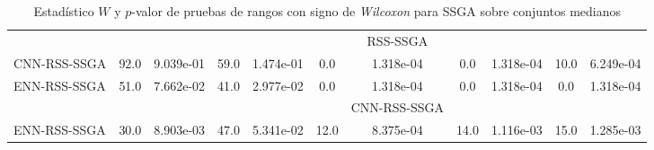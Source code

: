 \begin{table}[]
\begin{adjustbox}{max width =\textwidth}
\begin{tabular}{l c c c c c c c c c c}
\hline

 & & & & & & RSS-SSGA & & & & \\
CNN-RSS-SSGA & 92.0 & 9.039e-01 & 59.0 & 1.474e-01 & 0.0 & 1.318e-04 & 0.0 & 1.318e-04 & 10.0 & 6.249e-04 \\ 
ENN-RSS-SSGA & 51.0 & 7.662e-02 & 41.0 & 2.977e-02 & 0.0 & 1.318e-04 & 0.0 & 1.318e-04 & 0.0 & 1.318e-04 \\  

\hline

 & & & & & & CNN-RSS-SSGA & & & & \\ 
ENN-RSS-SSGA & 30.0 & 8.903e-03 & 47.0 & 5.341e-02 & 12.0 & 8.375e-04 & 14.0 & 1.116e-03 & 15.0 & 1.285e-03 \\ 

\hline

\end{tabular}
\end{adjustbox}
\caption[Pruebas de \emph{Wilcoxon} entre SSGA y variaciones para conjuntos medianos]{Estadístico $W$ y $p$-valor de pruebas de rangos con signo de \emph{Wilcoxon} para SSGA sobre conjuntos medianos}
\label{wilcox-SSGA-med}
\end{table}

